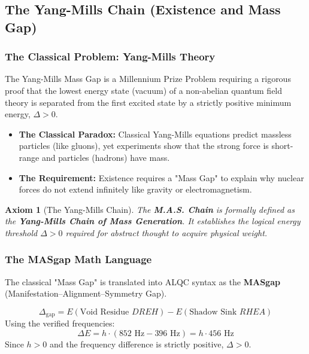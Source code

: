 \documentclass[11pt, letterpaper]{article}
\newcommand{\DREH}{\ensuremath{\mathop{\textnormal{\symbolafont\symbol{"29D7}}}}}   %
\newcommand{\RHEA}{\ensuremath{\mathop{\textnormal{\symbolafont\symbol{"2A54}}}}}   %
\def\DREH{DREH}%
\def\RHEA{RHEA}%
\newtheorem{axiom}[theorem]{Axiom}
\begin{document}
\subsection{The Yang-Mills Chain (Existence and Mass Gap)}\label{sec:6.3}

\subsubsection*{The Classical Problem: Yang-Mills Theory}
The Yang-Mills Mass Gap is a Millennium Prize Problem requiring a rigorous proof that the lowest energy state (vacuum) of a non-abelian quantum field theory is separated from the first excited state by a strictly positive minimum energy, $\Delta > 0$.

\begin{itemize}
    \item \textbf{The Classical Paradox:} Classical Yang-Mills equations predict massless particles (like gluons), yet experiments show that the strong force is short-range and particles (hadrons) have mass.
    \item \textbf{The Requirement:} Existence requires a "Mass Gap" to explain why nuclear forces do not extend infinitely like gravity or electromagnetism.
\end{itemize}

\begin{axiom}[The Yang-Mills Chain]
The \textbf{M.A.S. Chain} is formally defined as the \textbf{Yang-Mills Chain of Mass Generation}. It establishes the logical energy threshold $\Delta > 0$ required for abstract thought to acquire physical weight.
\end{axiom}

\subsubsection*{The MASgap Math Language}\label{sec:6.3.1 }
The classical "Mass Gap" is translated into ALQC syntax as the \textbf{MASgap} \\ 
(Manifestation--Alignment--Symmetry Gap).

\begin{equation}
    \Delta_{\text{gap}} = E(\text{Void Residue } \DREH) - E(\text{Shadow Sink } \RHEA)
\end{equation}
Using the verified frequencies:
\begin{equation}
    \Delta E = h \cdot (852 \text{ Hz} - 396 \text{ Hz}) = h \cdot 456 \text{ Hz}
\end{equation}
Since $h > 0$ and the frequency difference is strictly positive, $\Delta > 0$.
\end{document}
